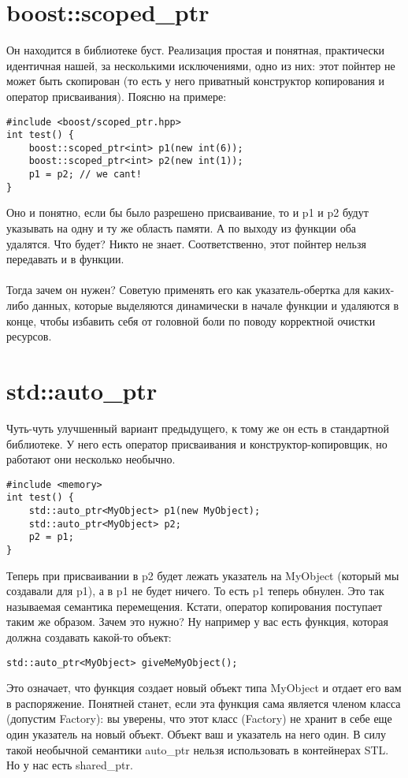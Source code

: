 ﻿\documentclass {article}
\begin{document}
\section{boost::scoped\_ptr}
Он находится в библиотеке буст.
Реализация простая и понятная, практически идентичная нашей, за несколькими исключениями, одно из них: этот пойнтер не может быть скопирован (то есть у него приватный конструктор копирования и оператор присваивания). Поясню на примере:
\begin{lstlisting}[caption=Пример]
#include <boost/scoped_ptr.hpp>
int test() {
    boost::scoped_ptr<int> p1(new int(6));
    boost::scoped_ptr<int> p2(new int(1));    
    p1 = p2; // we cant!
}
\end{lstlisting}
Оно и понятно, если бы было разрешено присваивание, то и p1 и p2 будут указывать на одну и ту же область памяти. А по выходу из функции оба удалятся. Что будет? Никто не знает. Соответственно, этот пойнтер нельзя передавать и в функции.\\\\
Тогда зачем он нужен? Советую применять его как указатель-обертка для каких-либо данных, которые выделяются динамически в начале функции и удаляются в конце, чтобы избавить себя от головной боли по поводу корректной очистки ресурсов.
\section{std::auto\_ptr}
Чуть-чуть улучшенный вариант предыдущего, к тому же он есть в стандартной библиотеке. У него есть оператор присваивания и конструктор-копировщик, но работают они несколько необычно.
\begin{lstlisting}[caption=Пример]
#include <memory>
int test() {
    std::auto_ptr<MyObject> p1(new MyObject);
    std::auto_ptr<MyObject> p2;    
    p2 = p1;
}
\end{lstlisting}
Теперь при присваивании в p2 будет лежать указатель на MyObject (который мы создавали для p1), а в p1 не будет ничего. То есть p1 теперь обнулен. Это так называемая семантика перемещения. Кстати, оператор копирования поступает таким же образом.
Зачем это нужно? Ну например у вас есть функция, которая должна создавать какой-то объект:
\begin{lstlisting}[caption=Пример]
    std::auto_ptr<MyObject> giveMeMyObject();
\end{lstlisting}
Это означает, что функция создает новый объект типа MyObject и отдает его вам в распоряжение. Понятней станет, если эта функция сама является членом класса (допустим Factory): вы уверены, что этот класс (Factory) не хранит в себе еще один указатель на новый объект. Объект ваш и указатель на него один.
В силу такой необычной семантики auto\_ptr нельзя использовать в контейнерах STL. Но у нас есть shared\_ptr.
\end{document}
